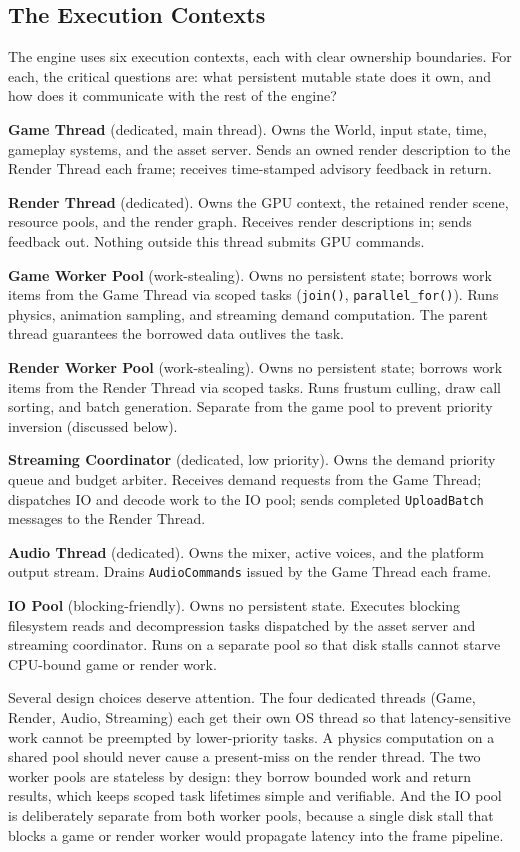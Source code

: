 \documentclass[
  11pt,
  letterpaper,
  DIV=11,
  numbers=noendperiod,
  twoside,
  open=right]{scrreprt}
\begin{document}
\subsection{The Execution Contexts}\label{the-execution-contexts}

The engine uses six execution contexts, each with clear ownership
boundaries. For each, the critical questions are: what persistent
mutable state does it own, and how does it communicate with the rest of
the engine?

\textbf{Game Thread} (dedicated, main thread). Owns the World, input
state, time, gameplay systems, and the asset server. Sends an owned
render description to the Render Thread each frame; receives
time-stamped advisory feedback in return.

\textbf{Render Thread} (dedicated). Owns the GPU context, the retained
render scene, resource pools, and the render graph. Receives render
descriptions in; sends feedback out. Nothing outside this thread submits
GPU commands.

\textbf{Game Worker Pool} (work-stealing). Owns no persistent state;
borrows work items from the Game Thread via scoped tasks
(\texttt{join()}, \texttt{parallel\_for()}). Runs physics, animation
sampling, and streaming demand computation. The parent thread guarantees
the borrowed data outlives the task.

\textbf{Render Worker Pool} (work-stealing). Owns no persistent state;
borrows work items from the Render Thread via scoped tasks. Runs frustum
culling, draw call sorting, and batch generation. Separate from the game
pool to prevent priority inversion (discussed below).

\textbf{Streaming Coordinator} (dedicated, low priority). Owns the
demand priority queue and budget arbiter. Receives demand requests from
the Game Thread; dispatches IO and decode work to the IO pool; sends
completed \texttt{UploadBatch} messages to the Render Thread.

\textbf{Audio Thread} (dedicated). Owns the mixer, active voices, and
the platform output stream. Drains \texttt{AudioCommands} issued by the
Game Thread each frame.

\textbf{IO Pool} (blocking-friendly). Owns no persistent state. Executes
blocking filesystem reads and decompression tasks dispatched by the
asset server and streaming coordinator. Runs on a separate pool so that
disk stalls cannot starve CPU-bound game or render work.

Several design choices deserve attention. The four dedicated threads
(Game, Render, Audio, Streaming) each get their own OS thread so that
latency-sensitive work cannot be preempted by lower-priority tasks. A
physics computation on a shared pool should never cause a present-miss
on the render thread. The two worker pools are stateless by design: they
borrow bounded work and return results, which keeps scoped task
lifetimes simple and verifiable. And the IO pool is deliberately
separate from both worker pools, because a single disk stall that blocks
a game or render worker would propagate latency into the frame pipeline.
\end{document}
